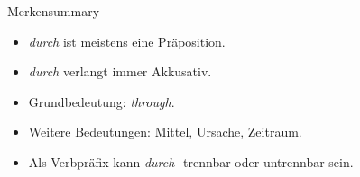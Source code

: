 \documentclass[a4paper,11pt]{article}
\begin{document}
\begin{grammarentry}{Merken}{summary}
\begin{itemize}
    \item \textit{durch} ist meistens eine Präposition.
    \item \textit{durch} verlangt immer Akkusativ.
    \item Grundbedeutung: \textit{through}.
    \item Weitere Bedeutungen: Mittel, Ursache, Zeitraum.
    \item Als Verbpräfix kann \textit{durch-} trennbar oder untrennbar sein.
\end{itemize}
\end{grammarentry}
\end{document}
